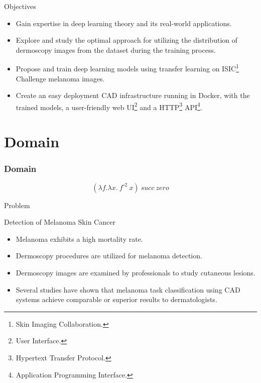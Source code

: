 \documentclass[dvipsnames,mathserif]{beamer}
\begin{document}
{    \begin{frame}
      \large Objectives
      \vspace{0.25cm}

      \footnotesize
      \begin{itemize}
        \item Gain expertise in deep learning theory and its real-world
          applications.
        \item Explore and study the optimal approach for utilizing the distribution
          of dermoscopy images from the dataset during the training process.
        \item Propose and train deep learning models using transfer learning on ISIC\footnote{Skin Imaging Collaboration.}
          Challenge melanoma images.
        \item Create an easy deployment CAD infrastructure running in Docker,
          with the trained models, a user-friendly web UI\footnote{User
          Interface.} and a HTTP\footnote{Hypertext Transfer Protocol.}
          API\footnote{Application Programming Interface.}.
      \end{itemize}


    \end{frame}

    \section{Domain}

    \begin{frame}
      \frametitle{Domain}

      \[(\lambda f. \lambda x.\ f^{\circ 2}\ x)\ succ\ zero\]
    \end{frame}

    \begin{frame}
      \begin{center}
        \Huge Problem
      \end{center}
    \end{frame}


    \begin{frame}
      \large Detection of Melanoma Skin Cancer
      \vspace{0.25cm}

      \footnotesize
      \begin{itemize}
        \item Melanoma exhibits a high mortality rate.
        \item Dermoscopy procedures are utilized for melanoma detection.
        \item Dermoscopy images are examined by professionals to study cutaneous lesions.
        \item Several studies have shown that melanoma task classification
          using CAD systems achieve comparable or superior results to
          dermatologists.
      \end{itemize}



\end{frame}}
\end{document}
